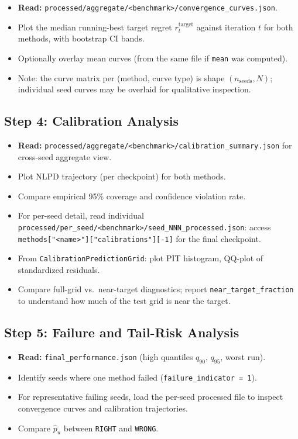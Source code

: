 \documentclass[11pt]{article}
\newcommand{\RIGHT}{\texttt{RIGHT}}
\newcommand{\WRONG}{\texttt{WRONG}}
\newcommand{\rtarget}{r_t^{\mathrm{target}}}
\begin{document}
\begin{itemize}
  \item \textbf{Read:} \texttt{processed/aggregate/<benchmark>/convergence\_curves.json}.
  \item Plot the median running-best target regret $\rtarget$ against iteration $t$
        for both methods, with bootstrap CI bands.
  \item Optionally overlay mean curves (from the same file if \texttt{mean} was computed).
  \item Note: the curve matrix per (method, curve type) is shape
        $(n_{\mathrm{seeds}}, N)$; individual seed curves may be overlaid for
        qualitative inspection.
\end{itemize}
 
\subsection{Step 4: Calibration Analysis}
 
\begin{itemize}
  \item \textbf{Read:} \texttt{processed/aggregate/<benchmark>/calibration\_summary.json}
        for cross-seed aggregate view.
  \item Plot NLPD trajectory (per checkpoint) for both methods.
  \item Compare empirical 95\% coverage and confidence violation rate.
  \item For per-seed detail, read individual
        \texttt{processed/per\_seed/<benchmark>/seed\_NNN\_processed.json}:
        access \texttt{methods["<name>"]["calibrations"][-1]} for the final checkpoint.
  \item From \texttt{CalibrationPredictionGrid}: plot PIT histogram, QQ-plot of
        standardized residuals.
  \item Compare full-grid vs.\ near-target diagnostics; report
        \texttt{near\_target\_fraction} to understand how much of the test grid is
        near the target.
\end{itemize}
 
\subsection{Step 5: Failure and Tail-Risk Analysis}
 
\begin{itemize}
  \item \textbf{Read:} \texttt{final\_performance.json} (high quantiles
        $q_{90}$, $q_{95}$, worst run).
  \item Identify seeds where one method failed (\texttt{failure\_indicator = 1}).
  \item For representative failing seeds, load the per-seed processed file to inspect
        convergence curves and calibration trajectories.
  \item Compare $\hat{p}_u$ between \RIGHT{} and \WRONG{}.
\end{itemize}
 
\end{document}
